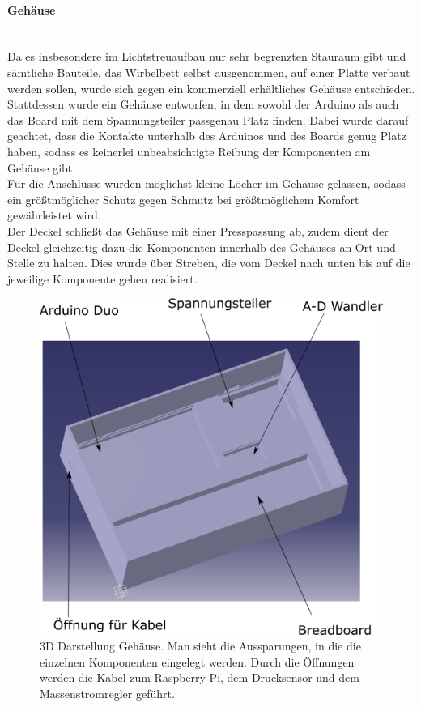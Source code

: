 \paragraph{Gehäuse} 
\hfill \\
Da es insbesondere im Lichtstreuaufbau nur sehr begrenzten Stauraum gibt und sämtliche Bauteile, das Wirbelbett selbst ausgenommen, auf einer Platte verbaut werden sollen, wurde sich gegen ein kommerziell erhältliches Gehäuse entschieden. \\ 
Stattdessen wurde ein Gehäuse entworfen, in dem sowohl der Arduino als auch das Board mit dem Spannungsteiler passgenau Platz finden. Dabei wurde darauf geachtet, dass die Kontakte unterhalb des Arduinos und des Boards genug Platz haben, sodass es keinerlei unbeabsichtigte Reibung der Komponenten am Gehäuse gibt. \\
Für die Anschlüsse wurden möglichst kleine Löcher im Gehäuse gelassen, sodass ein größtmöglicher Schutz gegen Schmutz bei größtmöglichem Komfort gewährleistet wird. \\
Der Deckel schließt das Gehäuse mit einer Presspassung ab, zudem dient der Deckel gleichzeitig dazu die Komponenten innerhalb des Gehäuses an Ort und Stelle zu halten. Dies wurde über Streben, die vom Deckel nach unten bis auf die jeweilige Komponente gehen realisiert.

\clearpage


\begin{figure}[h!]
	\begin{center}
		\includegraphics[scale=0.45]{Elektronik_Gehaeuse2.png}
		\caption[Gehäuse räumlich]{3D Darstellung Gehäuse. Man sieht die Aussparungen, in die die einzelnen Komponenten eingelegt werden. Durch die Öffnungen werden die Kabel zum Raspberry Pi, dem Drucksensor und dem Massenstromregler geführt.}
	\end{center}
\end{figure}

